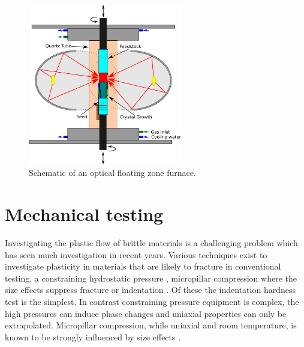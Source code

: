 \begin{figure}
\centering
\includegraphics[width=0.6\textwidth]{Image_Furnace_Schematic}
\caption{Schematic of an optical floating zone furnace.\label{fig:OFZF_schematic}}
\end{figure}














\section{Mechanical testing}
\label{sec:Ti2Ni_mechtesting}

Investigating the plastic flow of brittle materials is a challenging problem which has seen much investigation in recent years. Various techniques exist to investigate plasticity in materials that are likely to fracture in conventional testing, a constraining hydrostatic pressure \cite{Griggs1936,Weinrich1975,Borvin1990}, micropillar compression where the size effects suppress fracture \cite{Uchic2004} or indentation \cite{Cripps2011,tabor2000hardness,Marsh1964,Korte2009}. Of these the indentation hardness test is the simplest. In contrast constraining pressure equipment is complex, the high pressures can induce phase changes and uniaxial properties can only be extrapolated. Micropillar compression, while uniaxial and room temperature, is known to be strongly influenced by size effects \cite{Uchic2004,Greer2005,Greer2006corrigendum}.


